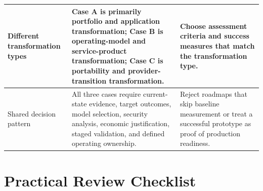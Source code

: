 \documentclass[11pt]{article}
\begin{document}
\begin{longtable}{@{}>{\RaggedRight\arraybackslash}p{}>{\RaggedRight\arraybackslash}p{}>{\RaggedRight\arraybackslash}p{}@{}}
Different transformation types & Case A is primarily portfolio and application transformation; Case B is operating-model and service-product transformation; Case C is portability and provider-transition transformation. & Choose assessment criteria and success measures that match the transformation type. \\\midrule
Shared decision pattern & All three cases require current-state evidence, target outcomes, model selection, security analysis, economic justification, staged validation, and defined operating ownership. & Reject roadmaps that skip baseline measurement or treat a successful prototype as proof of production readiness. \\\midrule
\bottomrule
\end{longtable}
\endgroup
\section{Practical Review Checklist}
\end{document}
